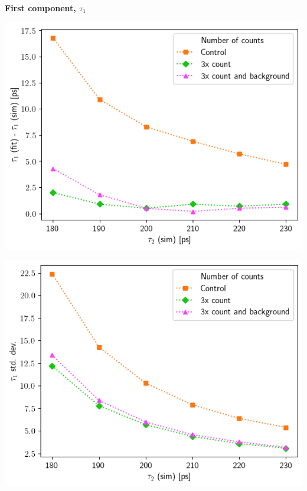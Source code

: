 {\textbf{First component, $\tau_1$}

\begin{minipage}{.47\linewidth}
     
    \includegraphics[width=\linewidth]{Batch 5/t1-diff 2080.png}
    \label{fig:compcount-t1-2080}
\end{minipage}
\hfill
\begin{minipage}{.47\linewidth}
     
    \includegraphics[width=\linewidth]{Batch 5/t1-err 2080.png}
    \label{fig:compcount-t1err-2080}
\end{minipage}
\begin{minipage}{.47\linewidth}
     

\end{minipage}}
